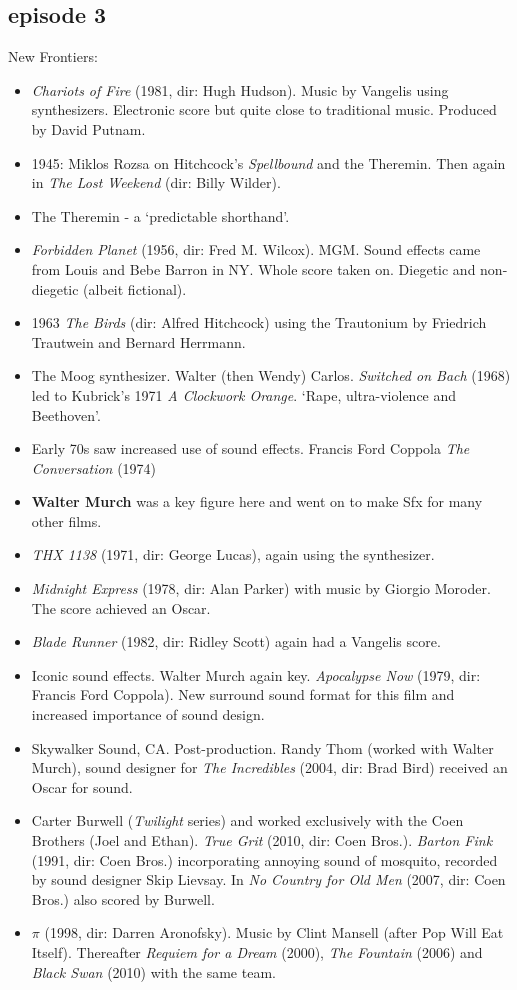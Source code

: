 \subsection{episode 3}
New Frontiers:
\begin{itemize}
\item \textit{Chariots of Fire} (1981, dir: Hugh Hudson). Music by Vangelis using synthesizers. Electronic score but quite close to traditional music. Produced by David Putnam.
\item 1945: Miklos Rozsa on Hitchcock's \textit{Spellbound} and the Theremin. Then again in \textit{The Lost Weekend} (dir: Billy Wilder). 
\item The Theremin - a `predictable shorthand'. 
\item \textit{Forbidden Planet} (1956, dir: Fred M. Wilcox). MGM. Sound effects came from Louis and Bebe Barron in NY. Whole score taken on. Diegetic and non-diegetic (albeit fictional). 
\item 1963 \textit{The Birds} (dir: Alfred Hitchcock) using the Trautonium by Friedrich Trautwein and Bernard Herrmann.  
\item The Moog synthesizer. Walter (then Wendy) Carlos. \textit{Switched on Bach} (1968) led to Kubrick's 1971 \textit{A Clockwork Orange}. `Rape, ultra-violence and Beethoven'. 
\item Early 70s saw increased use of sound effects. Francis Ford Coppola \textit{The Conversation} (1974)
\item \textbf{Walter Murch} was a key figure here and went on to make Sfx for many other films.
\item \textit{THX 1138} (1971, dir: George Lucas), again using the synthesizer.
\item \textit{Midnight Express} (1978, dir: Alan Parker) with music by Giorgio Moroder. The score achieved an Oscar.
\item \textit{Blade Runner} (1982, dir: Ridley Scott) again had a Vangelis score. 
\item Iconic sound effects. Walter Murch again key. \textit{Apocalypse Now} (1979, dir: Francis Ford Coppola). New surround sound format for this film and increased importance of sound design.
\item Skywalker Sound, CA. Post-production. Randy Thom (worked with Walter Murch), sound designer for \textit{The Incredibles} (2004, dir: Brad Bird) received an Oscar for sound.    
\item Carter Burwell (\textit{Twilight} series) and worked exclusively with the Coen Brothers (Joel and Ethan). \textit{True Grit} (2010, dir: Coen Bros.). \textit{Barton Fink} (1991, dir: Coen Bros.) incorporating annoying sound of mosquito, recorded by sound designer Skip Lievsay.
In \textit{No Country for Old Men} (2007, dir: Coen Bros.) also scored by Burwell. 
\item $\pi$ (1998, dir:  Darren Aronofsky). Music by Clint Mansell (after Pop Will Eat Itself). Thereafter \textit{Requiem for a Dream} (2000), \textit{The Fountain} (2006) and \textit{Black Swan} (2010) with the same team.  
\end{itemize}


